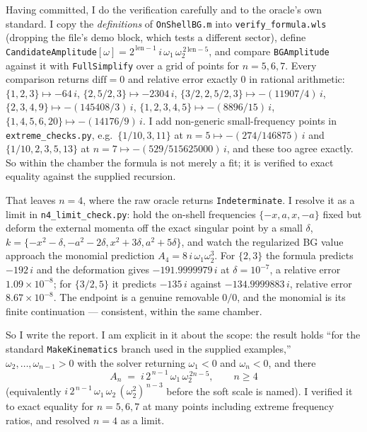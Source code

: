 \documentclass{article}
\begin{document}
Having committed, I do the verification carefully and to the oracle's own
standard. I copy the \emph{definitions} of \texttt{OnShellBG.m} into
\texttt{verify\_formula.wls} (dropping the file's demo block, which tests a
different sector), define
\texttt{CandidateAmplitude}$[\omega]=2^{\,\text{len}-1}\,i\,\omega_1\,
\omega_2^{\,2\,\text{len}-5}$, and compare \texttt{BGAmplitude} against it with
\texttt{FullSimplify} over a grid of points for $n=5,6,7$. Every comparison
returns $\mathrm{diff}=0$ and relative error exactly $0$ in rational arithmetic:
$\{1,2,3\}\mapsto-64\,i$, $\{2,5/2,3\}\mapsto-2304\,i$,
$\{3/2,2,5/2,3\}\mapsto-(11907/4)\,i$, $\{2,3,4,9\}\mapsto-(145408/3)\,i$,
$\{1,2,3,4,5\}\mapsto-(8896/15)\,i$, $\{1,4,5,6,20\}\mapsto-(14176/9)\,i$. I add
non-generic small-frequency points in \texttt{extreme\_checks.py}, e.g.\
$\{1/10,3,11\}$ at $n=5\mapsto-(274/146875)\,i$ and $\{1/10,2,3,5,13\}$ at
$n=7\mapsto-(529/515625000)\,i$, and these too agree exactly. So within the
chamber the formula is not merely a fit; it is verified to exact equality against
the supplied recursion.

That leaves $n=4$, where the raw oracle returns \texttt{Indeterminate}. I resolve
it as a limit in \texttt{n4\_limit\_check.py}: hold the on-shell frequencies
$\{-x,a,x,-a\}$ fixed but deform the external momenta off the exact singular point
by a small $\delta$, $k=\{-x^2-\delta,-a^2-2\delta,x^2+3\delta,a^2+5\delta\}$, and
watch the regularized BG value approach the monomial prediction
$A_4=8\,i\,\omega_1\omega_2^3$. For $\{2,3\}$ the formula predicts $-192\,i$ and the
deformation gives $-191.9999979\,i$ at $\delta=10^{-7}$, a relative error
$1.09\times10^{-8}$; for $\{3/2,5\}$ it predicts $-135\,i$ against $-134.9999883\,i$,
relative error $8.67\times10^{-8}$. The endpoint is a genuine removable $0/0$, and
the monomial is its finite continuation --- consistent, within the same chamber.

So I write the report. I am explicit in it about the scope: the result holds ``for
the standard \texttt{MakeKinematics} branch used in the supplied examples,''
$\omega_2,\dots,\omega_{n-1}>0$ with the solver returning $\omega_1<0$ and
$\omega_n<0$, and there
\[
\boxed{\;A_n \;=\; i\,2^{\,n-1}\,\omega_1\,\omega_2^{\,2n-5},\qquad n\ge4\;}
\]
(equivalently $i\,2^{\,n-1}\,\omega_1\,\omega_2\,(\omega_2^2)^{\,n-3}$ before the
soft scale is named). I verified it to exact equality for $n=5,6,7$ at many
points including extreme frequency ratios, and resolved $n=4$ as a limit.
\end{document}
